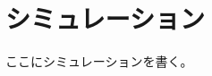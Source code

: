 \documentclass[fleqn]{jreport}
\begin{document}
    \chapter{シミュレーション}
        ここにシミュレーションを書く。
\end{document}
